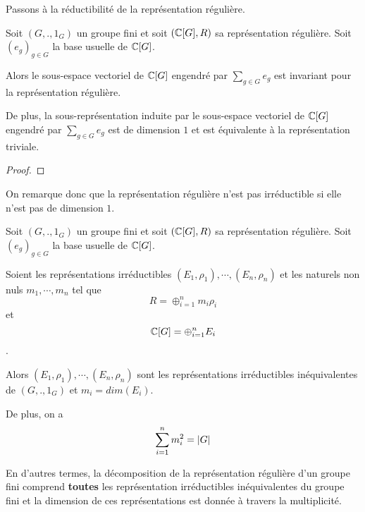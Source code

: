 Passons à la réductibilité de la représentation régulière.

\begin{proposition}
	Soit $(G, ., 1_{G})$ un groupe fini et soit $(\mathbb{C}[G],
	R)$ sa représentation régulière. Soit $(e_{g})_{g \in G}$
	la base usuelle de $\mathbb{C}[G]$.

	Alors le sous-espace vectoriel de $\mathbb{C}[G]$ engendré par $\sum_{g \in G} e_{g}$ est invariant pour la
	représentation régulière.

	De plus, la sous-représentation induite par le sous-espace vectoriel de
	$\mathbb{C}[G]$ engendré par $\sum_{g \in G} e_{g}$ est de dimension $1$ et est équivalente à la représentation triviale.
\end{proposition}

\ifdefined\outputproof
\begin{proof}

\end{proof}
\fi

On remarque donc que la représentation régulière n'est pas irréductible si elle
n'est pas de dimension $1$.

\begin{proposition}
	Soit $(G, ., 1_{G})$ un groupe fini et soit $(\mathbb{C}[G],
	R)$ sa représentation régulière. Soit $(e_{g})_{g \in G}$
	la base usuelle de $\mathbb{C}[G]$.

	Soient les représentations irréductibles $(E_{1},
	\rho_{1}), \cdots, (E_{n},
	\rho_{n})$ et les naturels non nuls $m_{1}, \cdots,
	m_{n}$ tel que
	\begin{equation}
		R = \oplus_{i = 1}^{n} m_{i} \rho_{i}
	\end{equation}
	et
	\begin{equation}
		\mathbb{C}[G] = \oplus_{i = 1}^{n} E_{i}
	\end{equation}.

	Alors $(E_{1}, \rho_{1}), \cdots, (E_{n},
	\rho_{n})$ sont les représentations irréductibles
	inéquivalentes de $(G, ., 1_{G})$ et $m_{i} = dim(E_{i})$.

	De plus, on a
	\begin{equation}
		\sum_{i = 1}^{n} m_{i}^{2} = |G|
	\end{equation}

	En d'autres termes, la décomposition de la représentation régulière d'un
	groupe fini comprend \textbf{toutes} les représentation irréductibles
	inéquivalentes du groupe fini et la dimension de ces représentations est
	donnée à travers la multiplicité.
\end{proposition}

